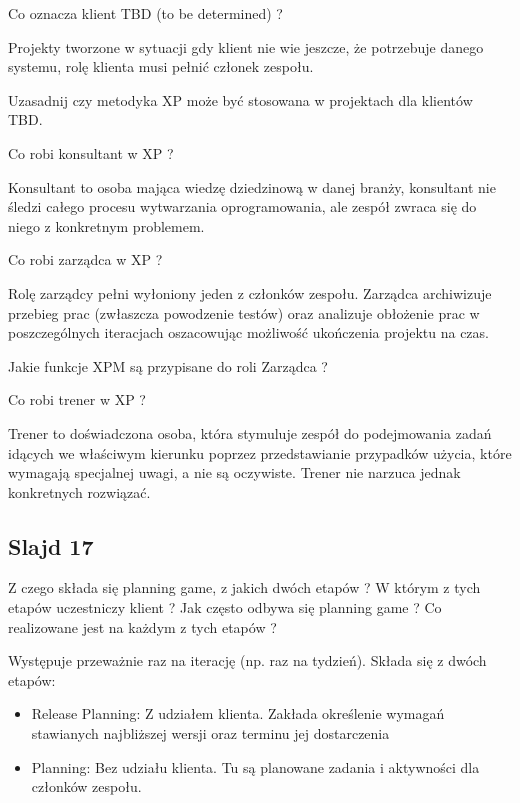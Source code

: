 \documentclass[a4paper,15pt]{article}
\newcommand{\question}[2]{
    \begin{tcolorbox}[colback=mRed!5!white,colframe=mRed,title={Kolokwium 2018 #1}]
        #2
    \end{tcolorbox}
}
\begin{document}
\begin{framed}
Co oznacza klient TBD (to be determined) ?
\end{framed}
Projekty tworzone w sytuacji gdy klient nie wie jeszcze, że potrzebuje danego systemu, rolę klienta musi pełnić członek zespołu.

\question{}{
Uzasadnij czy metodyka XP może być stosowana w projektach dla klientów TBD. }

\begin{framed}
Co robi konsultant w XP ?
\end{framed}
Konsultant to osoba mająca wiedzę dziedzinową w danej branży, konsultant nie śledzi całego procesu wytwarzania oprogramowania, ale zespół zwraca się do niego z konkretnym problemem.

\begin{framed}
Co robi zarządca w XP ?
\end{framed}
Rolę zarządcy pełni wyłoniony jeden z członków zespołu. Zarządca archiwizuje przebieg prac (zwłaszcza powodzenie testów) oraz analizuje obłożenie prac w poszczególnych iteracjach oszacowując możliwość ukończenia projektu na czas. 
\question{}{
Jakie funkcje XPM są przypisane do roli Zarządca ?
}

\begin{framed}
Co robi trener w XP ?
\end{framed}
Trener to doświadczona osoba, która stymuluje zespół do podejmowania zadań idących we właściwym kierunku poprzez przedstawianie przypadków użycia, które wymagają specjalnej uwagi, a nie są oczywiste. Trener nie narzuca jednak konkretnych rozwiązać.

\subsection{Slajd 17}
\begin{framed}
Z czego składa się planning game, z jakich dwóch etapów ? W którym z tych etapów uczestniczy klient ? Jak często odbywa się planning game ?  Co realizowane jest na każdym z tych etapów ? 
\end{framed}
Występuje przeważnie raz na iterację (np. raz na tydzień). Składa się z dwóch etapów:
\begin{itemize}
\item Release Planning: Z udziałem klienta. Zakłada określenie wymagań stawianych najbliższej wersji oraz terminu jej dostarczenia
\item Planning: Bez udziału klienta. Tu są planowane zadania i aktywności dla członków zespołu. 
\end{itemize}
\end{document}
